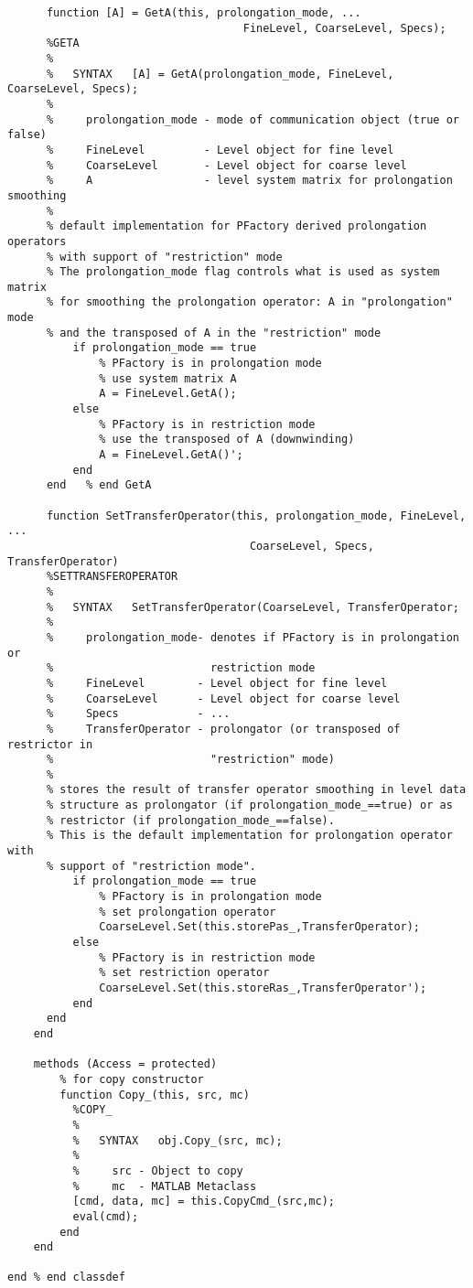 \begin{verbatim}
      function [A] = GetA(this, prolongation_mode, ...
                                    FineLevel, CoarseLevel, Specs);
      %GETA
      %
      %   SYNTAX   [A] = GetA(prolongation_mode, FineLevel, CoarseLevel, Specs);
      %
      %     prolongation_mode - mode of communication object (true or false)
      %     FineLevel         - Level object for fine level
      %     CoarseLevel       - Level object for coarse level
      %     A                 - level system matrix for prolongation smoothing
      %
      % default implementation for PFactory derived prolongation operators
      % with support of "restriction" mode
      % The prolongation_mode flag controls what is used as system matrix
      % for smoothing the prolongation operator: A in "prolongation" mode
      % and the transposed of A in the "restriction" mode
          if prolongation_mode == true
              % PFactory is in prolongation mode
              % use system matrix A
              A = FineLevel.GetA();
          else
              % PFactory is in restriction mode
              % use the transposed of A (downwinding)
              A = FineLevel.GetA()';
          end
      end   % end GetA
      
      function SetTransferOperator(this, prolongation_mode, FineLevel, ...
                                     CoarseLevel, Specs, TransferOperator)
      %SETTRANSFEROPERATOR
      %
      %   SYNTAX   SetTransferOperator(CoarseLevel, TransferOperator;
      %
      %     prolongation_mode- denotes if PFactory is in prolongation or
      %                        restriction mode
      %     FineLevel        - Level object for fine level
      %     CoarseLevel      - Level object for coarse level
      %     Specs            - ...
      %     TransferOperator - prolongator (or transposed of restrictor in
      %                        "restriction" mode)
      %
      % stores the result of transfer operator smoothing in level data
      % structure as prolongator (if prolongation_mode_==true) or as
      % restrictor (if prolongation_mode_==false).
      % This is the default implementation for prolongation operator with
      % support of "restriction mode".
          if prolongation_mode == true
              % PFactory is in prolongation mode
              % set prolongation operator
              CoarseLevel.Set(this.storePas_,TransferOperator);
          else
              % PFactory is in restriction mode
              % set restriction operator
              CoarseLevel.Set(this.storeRas_,TransferOperator');
          end
      end      
    end
    
    methods (Access = protected)
        % for copy constructor
        function Copy_(this, src, mc)
          %COPY_
          %
          %   SYNTAX   obj.Copy_(src, mc);
          %
          %     src - Object to copy
          %     mc  - MATLAB Metaclass
          [cmd, data, mc] = this.CopyCmd_(src,mc);
          eval(cmd);
        end        
    end

end % end classdef
\end{verbatim}

